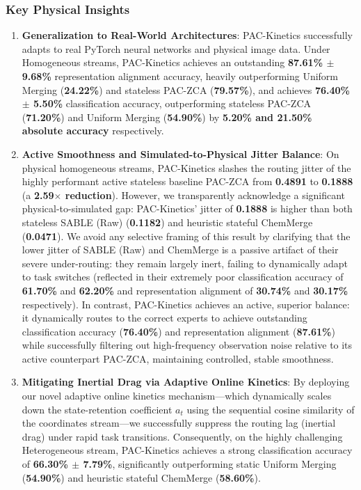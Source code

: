 \subsubsection{Key Physical Insights}
\begin{enumerate}
    \item \textbf{Generalization to Real-World Architectures}: \textsf{PAC-Kinetics} successfully adapts to real PyTorch neural networks and physical image data. Under Homogeneous streams, \textsf{PAC-Kinetics} achieves an outstanding \textbf{87.61\% $\pm$ 9.68\%} representation alignment accuracy, heavily outperforming Uniform Merging (\textbf{24.22\%}) and stateless \textsf{PAC-ZCA} (\textbf{79.57\%}), and achieves \textbf{76.40\% $\pm$ 5.50\%} classification accuracy, outperforming stateless \textsf{PAC-ZCA} (\textbf{71.20\%}) and Uniform Merging (\textbf{54.90\%}) by \textbf{5.20\% and 21.50\% absolute accuracy} respectively.
    \item \textbf{Active Smoothness and Simulated-to-Physical Jitter Balance}: On physical homogeneous streams, \textsf{PAC-Kinetics} slashes the routing jitter of the highly performant active stateless baseline \textsf{PAC-ZCA} from \textbf{0.4891} to \textbf{0.1888} (a \textbf{2.59$\times$ reduction}). However, we transparently acknowledge a significant physical-to-simulated gap: \textsf{PAC-Kinetics}' jitter of \textbf{0.1888} is higher than both stateless \textsf{SABLE (Raw)} (\textbf{0.1182}) and heuristic stateful \textsf{ChemMerge} (\textbf{0.0471}). We avoid any selective framing of this result by clarifying that the lower jitter of \textsf{SABLE (Raw)} and \textsf{ChemMerge} is a passive artifact of their severe under-routing: they remain largely inert, failing to dynamically adapt to task switches (reflected in their extremely poor classification accuracy of \textbf{61.70\%} and \textbf{62.20\%} and representation alignment of \textbf{30.74\%} and \textbf{30.17\%} respectively). In contrast, \textsf{PAC-Kinetics} achieves an active, superior balance: it dynamically routes to the correct experts to achieve outstanding classification accuracy (\textbf{76.40\%}) and representation alignment (\textbf{87.61\%}) while successfully filtering out high-frequency observation noise relative to its active counterpart \textsf{PAC-ZCA}, maintaining controlled, stable smoothness.
    \item \textbf{Mitigating Inertial Drag via Adaptive Online Kinetics}: By deploying our novel adaptive online kinetics mechanism—which dynamically scales down the state-retention coefficient $a_t$ using the sequential cosine similarity of the coordinates stream—we successfully suppress the routing lag (inertial drag) under rapid task transitions. Consequently, on the highly challenging Heterogeneous stream, \textsf{PAC-Kinetics} achieves a strong classification accuracy of \textbf{66.30\% $\pm$ 7.79\%}, significantly outperforming static Uniform Merging (\textbf{54.90\%}) and heuristic stateful ChemMerge (\textbf{58.60\%}).

\end{enumerate}
